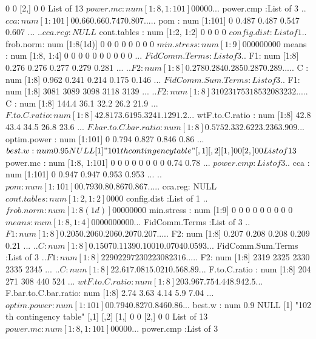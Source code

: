 \documentclass[11pt]{article} %
\begin{document}
\begin{Schunk}
\begin{Soutput}
     [,1] [,2]
[1,]    0    0
[2,]    0    0
List of 13
 $ power.mc            : num [1:8, 1:101] 0 0 0 0 0 ...
 $ power.cmp           :List of 3
  ..$ cca    : num [1:101] 0 0.66 0.66 0.747 0.807 ...
  ..$ pom    : num [1:101] 0 0.487 0.487 0.547 0.607 ...
  ..$ cca.reg: NULL
 $ cont.tables         : num [1:2, 1:2] 0 0 0 0
 $ config.dist         :List of 1
  ..$ frob.norm: num [1:8(1d)] 0 0 0 0 0 0 0 0
 $ min.stress          : num [1:9] 0 0 0 0 0 0 0 0 0
 $ means               : num [1:8, 1:4] 0 0 0 0 0 0 0 0 0 0 ...
 $ FidComm.Terms       :List of 3
  ..$ F1: num [1:8] 0.276 0.276 0.277 0.279 0.281 ...
  ..$ F2: num [1:8] 0.278 0.284 0.285 0.287 0.289 ...
  ..$ C : num [1:8] 0.962 0.241 0.214 0.175 0.146 ...
 $ FidComm.Sum.Terms   :List of 3
  ..$ F1: num [1:8] 3081 3089 3098 3118 3139 ...
  ..$ F2: num [1:8] 3102 3175 3185 3208 3232 ...
  ..$ C : num [1:8] 144.4 36.1 32.2 26.2 21.9 ...
 $ F.to.C.ratio        : num [1:8] 42.8 173.6 195.3 241.1 291.2 ...
 $ wtF.to.C.ratio      : num [1:8] 42.8 43.4 34.5 26.8 23.6 ...
 $ F.bar.to.C.bar.ratio: num [1:8] 0.575 2.33 2.622 3.236 3.909 ...
 $ optim.power         : num [1:101] 0 0.794 0.827 0.846 0.86 ...
 $ best.w              : num 0.95
NULL
[1] "101 th contingency table"
     [,1] [,2]
[1,]    0    0
[2,]    0    0
List of 13
 $ power.mc            : num [1:8, 1:101] 0 0 0 0 0 0 0 0 0.74 0.78 ...
 $ power.cmp           :List of 3
  ..$ cca    : num [1:101] 0 0.947 0.947 0.953 0.953 ...
  ..$ pom    : num [1:101] 0 0.793 0.8 0.867 0.867 ...
  ..$ cca.reg: NULL
 $ cont.tables         : num [1:2, 1:2] 0 0 0 0
 $ config.dist         :List of 1
  ..$ frob.norm: num [1:8(1d)] 0 0 0 0 0 0 0 0
 $ min.stress          : num [1:9] 0 0 0 0 0 0 0 0 0
 $ means               : num [1:8, 1:4] 0 0 0 0 0 0 0 0 0 0 ...
 $ FidComm.Terms       :List of 3
  ..$ F1: num [1:8] 0.205 0.206 0.206 0.207 0.207 ...
  ..$ F2: num [1:8] 0.207 0.208 0.208 0.209 0.21 ...
  ..$ C : num [1:8] 0.1507 0.1139 0.1001 0.0704 0.0593 ...
 $ FidComm.Sum.Terms   :List of 3
  ..$ F1: num [1:8] 2290 2297 2302 2308 2316 ...
  ..$ F2: num [1:8] 2319 2325 2330 2335 2345 ...
  ..$ C : num [1:8] 22.6 17.08 15.02 10.56 8.89 ...
 $ F.to.C.ratio        : num [1:8] 204 271 308 440 524 ...
 $ wtF.to.C.ratio      : num [1:8] 203.9 67.7 54.4 48.9 42.5 ...
 $ F.bar.to.C.bar.ratio: num [1:8] 2.74 3.63 4.14 5.9 7.04 ...
 $ optim.power         : num [1:101] 0 0.794 0.827 0.846 0.86 ...
 $ best.w              : num 0.9
NULL
[1] "102 th contingency table"
     [,1] [,2]
[1,]    0    0
[2,]    0    0
List of 13
 $ power.mc            : num [1:8, 1:101] 0 0 0 0 0 ...
 $ power.cmp           :List of 3

\end{Soutput}
\end{Schunk}
\end{document}
